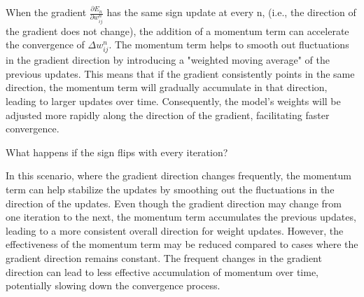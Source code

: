 \documentclass[a4paper, 12pt]{article}
\begin{document}
When the gradient $\frac{\partial E_{n}}{\partial w_{ij}^{n}}$ has the same sign update at every n,
(i.e., the direction of the gradient does not change), 
the addition of a momentum term can accelerate the convergence of $\Delta w_{ij}^{n}$.
The momentum term helps to smooth out fluctuations in the gradient direction by introducing a "weighted moving average" 
of the previous updates. This means that if the gradient consistently points in the same direction, 
the momentum term will gradually accumulate in that direction, leading to larger updates over time. 
Consequently, the model's weights will be adjusted more rapidly along the direction of the gradient, 
facilitating faster convergence.

\smallskip
\textcolor{myblue}{
    What happens if the sign flips with every iteration?
}  

In this scenario, where the gradient direction changes frequently, the momentum term can help stabilize the 
updates by smoothing out the fluctuations in the direction of the updates. 
Even though the gradient direction may change from one iteration to the next, the momentum term accumulates 
the previous updates, leading to a more consistent overall direction for weight updates.
However, the effectiveness of the momentum term may be reduced compared to cases where the gradient direction remains constant. 
The frequent changes in the gradient direction can lead to less effective accumulation of momentum over time, 
potentially slowing down the convergence process.
\end{document}
